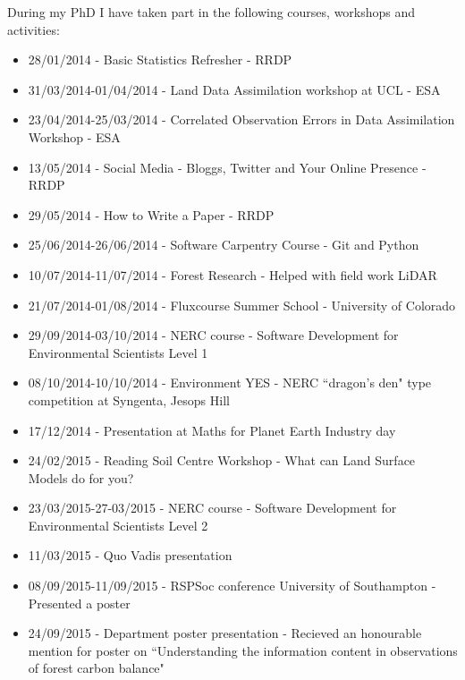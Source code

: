 \documentclass[11pt]{article}
\begin{document}
During my PhD I have taken part in the following courses, workshops and activities:
\begin{itemize}
\item 28/01/2014 - Basic Statistics Refresher - RRDP

\item 31/03/2014-01/04/2014 - Land Data Assimilation workshop at UCL - ESA

\item 23/04/2014-25/03/2014 - Correlated Observation Errors in Data Assimilation Workshop - ESA

\item 13/05/2014 - Social Media - Bloggs, Twitter and Your Online Presence - RRDP

\item 29/05/2014 - How to Write a Paper - RRDP

\item 25/06/2014-26/06/2014 - Software Carpentry Course - Git and Python

\item 10/07/2014-11/07/2014 - Forest Research - Helped with field work LiDAR

\item  21/07/2014-01/08/2014 - Fluxcourse Summer School - University of Colorado

\item 29/09/2014-03/10/2014 - NERC course - Software Development for Environmental Scientists Level 1

\item 08/10/2014-10/10/2014 - Environment YES - NERC ``dragon's den" type competition at Syngenta, Jesops Hill

\item 17/12/2014 - Presentation at Maths for Planet Earth Industry day

\item 24/02/2015 - Reading Soil Centre Workshop - What can Land Surface Models do for you?

\item 23/03/2015-27-03/2015 - NERC course - Software Development for Environmental Scientists Level 2

\item 11/03/2015 - Quo Vadis presentation

\item 08/09/2015-11/09/2015 - RSPSoc conference University of Southampton - Presented a poster

\item 24/09/2015 - Department poster presentation - Recieved an honourable mention for poster on ``Understanding the information content in observations of forest carbon balance"


\end{itemize}
\end{document}
